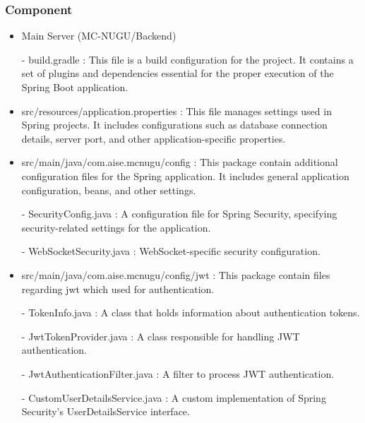 \documentclass[conference]{IEEEtran}
\begin{document}
        \subsubsection{Component}
            \begin{itemize}
                \item Main Server (MC-NUGU/Backend)
                    \item[-]build.gradle : This file is a build configuration for the project. It contains a set of plugins and dependencies essential for the proper execution of the Spring Boot application.
                \vspace{3mm}
                
                \item src/resources/application.properties : This file manages settings used in Spring projects. It includes configurations such as database connection details, server port, and other application-specific properties.
                \vspace{3mm}
                
                \item src/main/java/com.aise.mcnugu/config : This package contain additional configuration files for the Spring application. It includes general application configuration, beans, and other settings.
                    \item[-] SecurityConfig.java : A configuration file for Spring Security, specifying security-related settings for the application.
                    \item[-] WebSocketSecurity.java : WebSocket-specific security configuration.
                \vspace{3mm}
                
                \item src/main/java/com.aise.mcnugu/config/jwt : This package contain files regarding jwt which used for authentication.
                    \item[-] TokenInfo.java : A class that holds information about authentication tokens.
                    \item[-] JwtTokenProvider.java : A class responsible for handling JWT authentication.
                    \item[-] JwtAuthenticationFilter.java : A filter to process JWT authentication.
                    \item[-] CustomUserDetailsService.java : A custom implementation of Spring Security’s UserDetailsService interface.
                \vspace{3mm}
                

\end{itemize}
\end{document}
